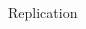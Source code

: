 \documentclass[final]{beamer}
\begin{document}
\begin{frame}{}
\begin{textblock}{67}
\begin{block}{Replication}
\begin{tabular}{c c c}
 
\end{tabular}
\end{block}
\end{textblock}
\end{frame}
\end{document}

